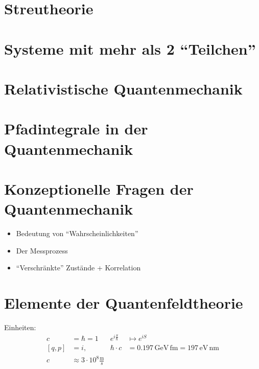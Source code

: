 \documentclass[ngerman, paper=a4, 12pt]{scrartcl}
\begin{document}
	\section{Streutheorie}
	 
	
	
	\section{Systeme mit mehr als 2 ``Teilchen''}
	
	
	 
	
	
	\section{Relativistische Quantenmechanik}
	
	
	
	\section{Pfadintegrale in der Quantenmechanik}
	
	
	
	
	
	
	
	
	
	
	\section{Konzeptionelle Fragen der Quantenmechanik} 
	\begin{itemize}
		\item Bedeutung von ``Wahrscheinlichkeiten''
		\item Der Messprozess
		\item ``Verschränkte'' Zustände + Korrelation
	\end{itemize}
	
	
	
	
	
	\section{Elemente der Quantenfeldtheorie} 
	Einheiten:
		\begin{align*}
			 c &= \hbar = 1 & e^{i \frac{S}{\hbar}} &\mapsto e^{iS} \\
			 [q, p] &= i ,&
			 \hbar \cdot c &= 0.197 \mathrm{\,GeV\,fm} = 197 \mathrm{\,eV\,nm} \\
			 c &\approx 3 \cdot 10^8 \frac{\mathrm{m}}{\mathrm{s}}
		\end{align*}
	
	
	
	
	
	
\end{document}
